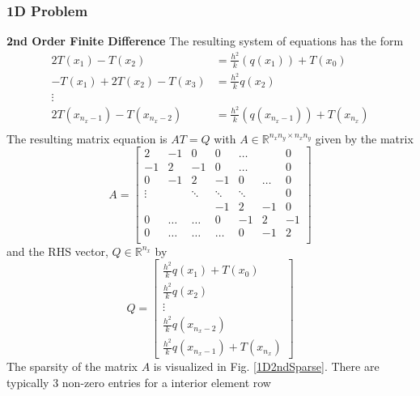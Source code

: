 \documentclass[letterpaper,12pt]{article}
\begin{document}
\subsubsection{1D Problem}
\textbf{2nd Order Finite Difference} The resulting system of equations has the form
\begin{align}
\label{1D2FDsys}
2 T(x_1) - T(x_2) &= \frac{h^2}{k} (q(x_1)) + T(x_0) \\
-T(x_1) + 2 T(x_2) - T(x_3) &= \frac{h^2}{k} q(x_2) \\
\vdots \\
2 T(x_{n_x - 1}) - T(x_{n_x - 2}) &= \frac{h^2}{k} (q(x_{n_x - 1})) + T(x_{n_x}) \\
\end{align}
The resulting matrix equation is $AT = Q$ with $A \in \mathbb{R}^{n_xn_y \times n_xn_y}$ given by the matrix
\[
A=
\begin{bmatrix}
2 & -1 & 0 & 0 & \dots &  & 0 \\
-1 & 2 & -1 & 0 & \dots &  & 0\\
0 & -1 & 2 & -1 & 0 & \dots & 0 \\
\vdots &  & \ddots & \ddots & \ddots & & 0 \\
 & & & -1 & 2 & -1 & 0 \\
0 & \dots & \dots & 0 & -1 & 2 & -1 \\
0 & \dots & \dots & \dots & 0 & -1 & 2 \\
\end{bmatrix}
\]
and the RHS vector, $Q \in \mathbb{R}^{n_x}$ by
\[
Q= 
\begin{bmatrix}
\frac{h^2}{k} q(x_1) + T(x_0) \\
\frac{h^2}{k} q(x_2) \\
\vdots \\
\frac{h^2}{k} q(x_{n_x-2}) \\
\frac{h^2}{k} q(x_{n_x-1}) + T(x_{n_x})
\end{bmatrix}
\]
The sparsity of the matrix $A$ is visualized in Fig. \ref{1D2ndSparse}. There are typically 3 non-zero entries for a interior element row
\end{document}
